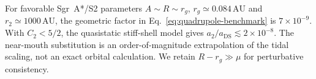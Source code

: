 \documentclass[aps,prd,10pt,onecolumn,nofootinbib,superscriptaddress,floatfix]{revtex4-2}
\begin{document}
For favorable Sgr~A*/S2 parameters $A\sim R\sim r_g$,
$r_g\simeq0.084\,\mathrm{AU}$ and $r_2\simeq1000\,\mathrm{AU}$,
the geometric factor in Eq.~\eqref{eq:quadrupole-benchmark} is
$7\times10^{-9}$.  With $C_2<5/2$, the quasistatic stiff-shell model
gives $a_2/a_{\mathrm{DS}}\lesssim2\times10^{-8}$.
The near-mouth substitution is an order-of-magnitude extrapolation of
the tidal scaling, not an exact orbital calculation.
We retain $R-r_g\gg\mu$ for perturbative consistency.



\end{document}

